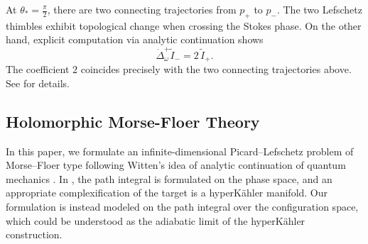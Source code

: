 \documentclass[11pt]{amsart}
\theoremstyle{plain}
\theoremstyle{definition}
\begin{document}
\begin{figure}[H]

\end{figure}

At $\theta_*=\frac{\pi}{2}$, there are two connecting trajectories from $p_+$ to $p_-$. The two Lefschetz thimbles exhibit topological change when crossing the Stokes phase. On the other hand, explicit computation via analytic continuation shows
$$
 \dot\Delta_{\omega}^{+}\widetilde I_-=
2\,\widetilde I_+.
$$
The coefficient $2$ coincides precisely with the two connecting trajectories above. See \cite{LiLiTang2026} for details. 

\subsection{Holomorphic Morse-Floer Theory}\label{sec:intro-MF} In this paper, we formulate an infinite-dimensional Picard–Lefschetz problem of Morse–Floer type following Witten's idea of analytic continuation of quantum mechanics \cite{Witten2010}. In \cite{Witten2010}, the path integral is formulated on the phase space, and an appropriate complexification of the target is a hyperK\"{a}hler manifold. Our formulation is  instead modeled on the path integral over the configuration space, which could be understood as the adiabatic limit of the hyperK\"ahler construction.
\end{document}
